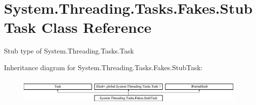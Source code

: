 \hypertarget{class_system_1_1_threading_1_1_tasks_1_1_fakes_1_1_stub_task}{\section{System.\-Threading.\-Tasks.\-Fakes.\-Stub\-Task Class Reference}
\label{class_system_1_1_threading_1_1_tasks_1_1_fakes_1_1_stub_task}
}


Stub type of System.\-Threading.\-Tasks.\-Task 


Inheritance diagram for System.\-Threading.\-Tasks.\-Fakes.\-Stub\-Task\-:\begin{figure}[H]
\begin{center}
\leavevmode
\includegraphics[height=1.347774cm]{class_system_1_1_threading_1_1_tasks_1_1_fakes_1_1_stub_task}
\end{center}
\end{figure}
